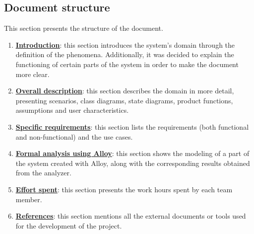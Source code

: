 \subsection{Document structure}
This section presents the structure of the document.
\begin{enumerate}
    \item \textbf{\hyperref[section1]{\underline{Introduction}}}: this section introduces the system's domain through the definition of the phenomena. Additionally, it was decided to explain the functioning of certain parts of the system in order to make the document more clear.
    \item \textbf{\hyperref[section2]{\underline{Overall description}}}: this section describes the domain in more detail, presenting scenarios, class diagrams, state diagrams, product functions, assumptions and user characteristics.
    \item \textbf{\hyperref[section3]{\underline{Specific requirements}}}: this section lists the requirements (both functional and non-functional) and the use cases.
    \item \textbf{\hyperref[section4]{\underline{Formal analysis using Alloy}}}: this section shows the modeling of a part of the system created with Alloy, along with the corresponding results obtained from the analyzer.
    \item \textbf{\hyperref[section5]{\underline{Effort spent}}}: this section presents the work hours spent by each team member.
    \item \textbf{\hyperref[section6]{\underline{References}}}: this section mentions all the external documents or tools used for the development of the project.
\end{enumerate}